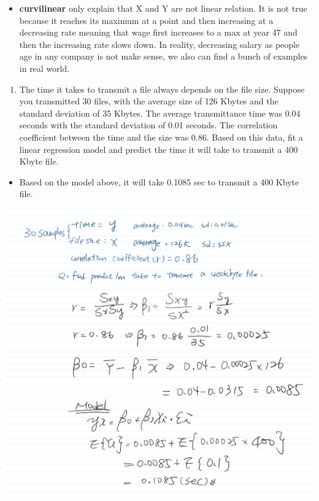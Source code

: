 \documentclass[
]{article}
\providecommand{\tightlist}{%
  \setlength{\itemsep}{0pt}\setlength{\parskip}{0pt}}
\begin{document}
\begin{itemize}
\tightlist
\item
  \textbf{curvilinear} only explain that X and Y are not linear
  relation. It is not true because it reaches its maximum at a point and
  then increasing at a decreasing rate meaning that wage first increases
  to a max at year 47 and then the increasing rate slows down. In
  reality, decreasing salary as people age in any company is not make
  sense, we also can find a bunch of examples in real world.
\end{itemize}

\begin{enumerate}
\def\labelenumi{\arabic{enumi}.}
\setcounter{enumi}{3}
\tightlist
\item
  The time it takes to transmit a file always depends on the file size.
  Suppose you transmitted 30 files, with the average size of 126 Kbytes
  and the standard deviation of 35 Kbytes. The average transmittance
  time was 0.04 seconds with the standard deviation of 0.01 seconds. The
  correlation coefficient between the time and the size was 0.86. Based
  on this data, fit a linear regression model and predict the time it
  will take to transmit a 400 Kbyte file.
\end{enumerate}

\begin{itemize}
\tightlist
\item
  Based on the model above, it will take 0.1085 sec to transmit a 400
  Kbyte file.
\end{itemize}

\includegraphics{pics/IMG_0445139B99EC-1.jpeg}
\end{document}
